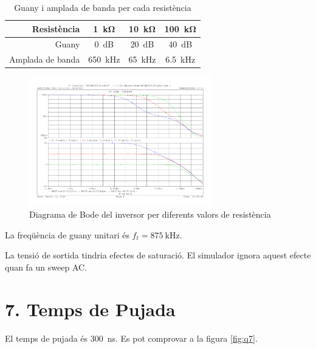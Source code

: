 \documentclass[catalan, a4paper, nobib]{tufte-handout}
\begin{document}
\begin{table}
    \begin{center}
      \begin{tabular}{@{}rccc@{}}
        \toprule
        Resistència & \qty{1}{\kilo\ohm} & \qty{10}{\kilo\ohm} & \qty{100}{\kilo\ohm} \\
        \midrule
        Guany & \qty{0}{\deci\bel} & \qty{20}{\deci\bel} & \qty{40}{\deci\bel} \\
        \midrule
        Amplada de banda & \qty{650}{\kilo\hertz} & \qty{65}{\kilo\hertz} & \qty{6.5}{\kilo\hertz} \\
        \bottomrule
      \end{tabular}
    \end{center}
    \caption{Guany i amplada de banda per cada resistència}
    \label{tab:t1}
\end{table}

\begin{figure}[h]
    \begin{center}
        \includegraphics[width=300px]{s2/6_1.pdf}
    \end{center}
    \caption{Diagrama de Bode del inversor per diferents valors de resistència}
\end{figure}

 La freqüència de guany unitari és $f_t = \qty{875}{\kilo\hertz}$.

 La tensió de sortida tindria efectes de saturació. El simulador ignora aquest efecte quan fa un sweep AC.

\section{7. Temps de Pujada}
 El temps de pujada és \qty{300}{\nano\second}. Es pot comprovar a la figura \ref{fig:q7}.
\end{document}
